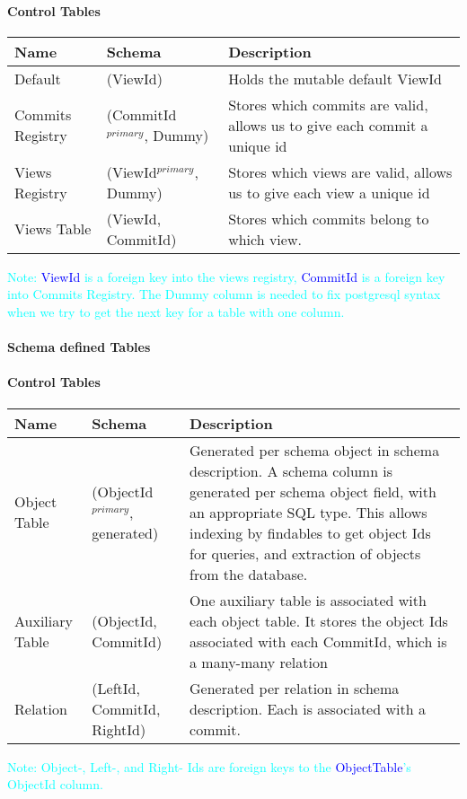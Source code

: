 \documentclass[12pt,a4paper,twoside,openright]{report}
\newcommand\codeName[1]{\textcolor{blue}{#1}}
\newcommand\note[1]{\textcolor{cyan}{#1}}
\begin{document}
{{		\paragraph{Control Tables}
		\begin{center}
			\begin{tabular}{|p{4cm}||p{4cm}|p{4cm}|} \hline
			Name & Schema & Description \\ \hline
			Default & (ViewId) & Holds the mutable default ViewId \\ \hline
			Commits Registry & (CommitId$^{primary}$, Dummy) & Stores which commits are valid, allows us to give each commit a unique id \\ \hline
			Views Registry & (ViewId$^{primary}$, Dummy) & Stores which views are valid, allows us to give each view a unique id \\ \hline
			Views Table & (ViewId, CommitId) & Stores which commits belong to which view. \\ \hline
			\end{tabular}
		\end{center}
\note{Note: \codeName{ViewId} is a foreign key into the views registry, \codeName{CommitId} is a foreign key into Commits Registry. The Dummy column is needed to fix postgresql syntax when we try to get the next key for a table with one column.}		
		
		\paragraph{Schema defined Tables}
				\paragraph{Control Tables}
		\begin{center}
			\begin{tabular}{|p{4cm}||p{4cm}|p{4cm}|} \hline
			Name & Schema & Description \\ \hline
			Object Table & (ObjectId$^{primary}$, generated) & Generated per schema object in schema description. A schema column is generated per schema object field, with an appropriate SQL type. This allows indexing by findables to get object Ids for queries, and extraction of objects from the database. \\ \hline
			Auxiliary Table & (ObjectId, CommitId) & One auxiliary table is associated with each object table. It stores the object Ids associated with each CommitId, which is a many-many relation \\ \hline
			Relation & (LeftId, CommitId, RightId) & Generated per relation in schema description. Each is associated with a commit.  \\ \hline
			\end{tabular}
		\end{center}
		\note{Note: Object-, Left-, and Right- Ids are foreign keys to the \codeName{ObjectTable}'s ObjectId column.}
}}
\end{document}
